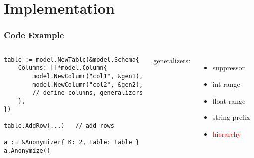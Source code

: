 \section{Implementation}

\begin{frame}[fragile]
  \frametitle{Code Example}
  \begin{columns}
  \scriptsize
  \begin{lstlisting}
table := model.NewTable(&model.Schema{
    Columns: []*model.Column{
        model.NewColumn("col1", &gen1),
        model.NewColumn("col2", &gen2),
        // define columns, generalizers
    },
})

table.AddRow(...)   // add rows

a := &Anonymizer{ K: 2, Table: table }
a.Anonymize()
  \end{lstlisting}
  generalizers:
  \begin{itemize}
    \item suppressor
    \item int range
    \item float range
    \item string prefix
    \item \textcolor{red}{hierarchy}
  \end{itemize}
  \end{columns}
\end{frame}

